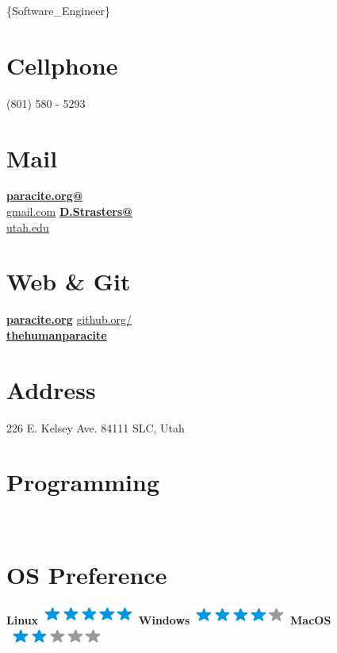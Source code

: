 \documentclass[]{friggeri-cv}
\begin{document}

{\{Software\_Engineer\}}


\begin{aside}
	\section{Cellphone} 
	(801) 580 - 5293
	~
	\section{Mail}
		\href{mailto:paracite.org@gmail.com}{\textbf{paracite.org@}\\gmail.com}
		\href{mailto:D.Strasters@utah.edu}{\textbf{D.Strasters@}\\utah.edu}
		~
	\section{Web \& Git}
		\href{http://paracite.org/portfolio}{\textbf{paracite.org}}
		\href{https://github.com/thehumanparacite}{github.org/\\ \textbf{thehumanparacite}}
		~
	\section{Address}
	226 E. Kelsey Ave.
	84111 SLC, Utah
	~ 
	\section{Programming}
	~
	\section{OS Preference}
		\textbf{Linux}\includegraphics[scale=0.40]{img/5stars.png}
		\textbf{Windows}\includegraphics[scale=0.40]{img/4stars.png}
		\textbf{MacOS}\includegraphics[scale=0.40]{img/2stars.png}
		~

\end{aside}
\end{document}
